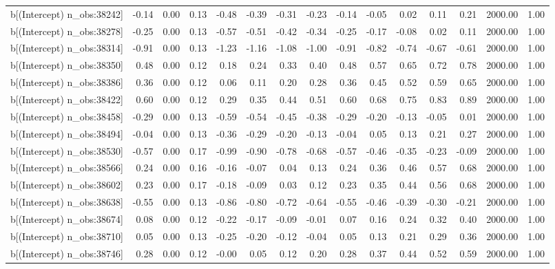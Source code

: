 \begin{table}[ht]
\begin{tabular}{rrrrrrrrrrrrrrr}
  b[(Intercept) n\_obs:38242] & -0.14 & 0.00 & 0.13 & -0.48 & -0.39 & -0.31 & -0.23 & -0.14 & -0.05 & 0.02 & 0.11 & 0.21 & 2000.00 & 1.00 \\ 
  b[(Intercept) n\_obs:38278] & -0.25 & 0.00 & 0.13 & -0.57 & -0.51 & -0.42 & -0.34 & -0.25 & -0.17 & -0.08 & 0.02 & 0.11 & 2000.00 & 1.00 \\ 
  b[(Intercept) n\_obs:38314] & -0.91 & 0.00 & 0.13 & -1.23 & -1.16 & -1.08 & -1.00 & -0.91 & -0.82 & -0.74 & -0.67 & -0.61 & 2000.00 & 1.00 \\ 
  b[(Intercept) n\_obs:38350] & 0.48 & 0.00 & 0.12 & 0.18 & 0.24 & 0.33 & 0.40 & 0.48 & 0.57 & 0.65 & 0.72 & 0.78 & 2000.00 & 1.00 \\ 
  b[(Intercept) n\_obs:38386] & 0.36 & 0.00 & 0.12 & 0.06 & 0.11 & 0.20 & 0.28 & 0.36 & 0.45 & 0.52 & 0.59 & 0.65 & 2000.00 & 1.00 \\ 
  b[(Intercept) n\_obs:38422] & 0.60 & 0.00 & 0.12 & 0.29 & 0.35 & 0.44 & 0.51 & 0.60 & 0.68 & 0.75 & 0.83 & 0.89 & 2000.00 & 1.00 \\ 
  b[(Intercept) n\_obs:38458] & -0.29 & 0.00 & 0.13 & -0.59 & -0.54 & -0.45 & -0.38 & -0.29 & -0.20 & -0.13 & -0.05 & 0.01 & 2000.00 & 1.00 \\ 
  b[(Intercept) n\_obs:38494] & -0.04 & 0.00 & 0.13 & -0.36 & -0.29 & -0.20 & -0.13 & -0.04 & 0.05 & 0.13 & 0.21 & 0.27 & 2000.00 & 1.00 \\ 
  b[(Intercept) n\_obs:38530] & -0.57 & 0.00 & 0.17 & -0.99 & -0.90 & -0.78 & -0.68 & -0.57 & -0.46 & -0.35 & -0.23 & -0.09 & 2000.00 & 1.00 \\ 
  b[(Intercept) n\_obs:38566] & 0.24 & 0.00 & 0.16 & -0.16 & -0.07 & 0.04 & 0.13 & 0.24 & 0.36 & 0.46 & 0.57 & 0.68 & 2000.00 & 1.00 \\ 
  b[(Intercept) n\_obs:38602] & 0.23 & 0.00 & 0.17 & -0.18 & -0.09 & 0.03 & 0.12 & 0.23 & 0.35 & 0.44 & 0.56 & 0.68 & 2000.00 & 1.00 \\ 
  b[(Intercept) n\_obs:38638] & -0.55 & 0.00 & 0.13 & -0.86 & -0.80 & -0.72 & -0.64 & -0.55 & -0.46 & -0.39 & -0.30 & -0.21 & 2000.00 & 1.00 \\ 
  b[(Intercept) n\_obs:38674] & 0.08 & 0.00 & 0.12 & -0.22 & -0.17 & -0.09 & -0.01 & 0.07 & 0.16 & 0.24 & 0.32 & 0.40 & 2000.00 & 1.00 \\ 
  b[(Intercept) n\_obs:38710] & 0.05 & 0.00 & 0.13 & -0.25 & -0.20 & -0.12 & -0.04 & 0.05 & 0.13 & 0.21 & 0.29 & 0.36 & 2000.00 & 1.00 \\ 
  b[(Intercept) n\_obs:38746] & 0.28 & 0.00 & 0.12 & -0.00 & 0.05 & 0.12 & 0.20 & 0.28 & 0.37 & 0.44 & 0.52 & 0.59 & 2000.00 & 1.00 \\ 

\end{tabular}
\end{table}
